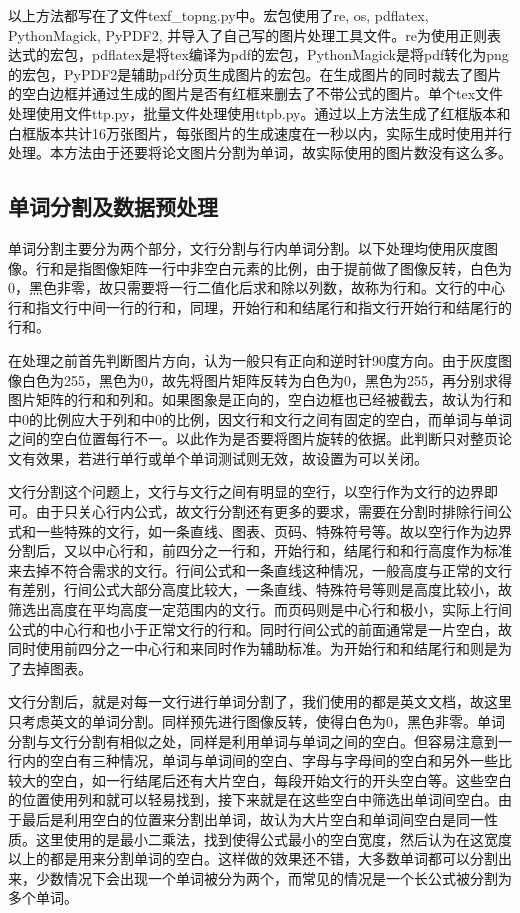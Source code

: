 \documentclass[12pt]{article}
\begin{document}
以上方法都写在了文件texf\_topng.py中。宏包使用了re, os, pdflatex, PythonMagick, PyPDF2, 并导入了自己写的图片处理工具文件。re为使用正则表达式的宏包，pdflatex是将tex编译为pdf的宏包，PythonMagick是将pdf转化为png的宏包，PyPDF2是辅助pdf分页生成图片的宏包。在生成图片的同时裁去了图片的空白边框并通过生成的图片是否有红框来删去了不带公式的图片。单个tex文件处理使用文件ttp.py，批量文件处理使用ttpb.py。通过以上方法生成了红框版本和白框版本共计16万张图片，每张图片的生成速度在一秒以内，实际生成时使用并行处理。本方法由于还要将论文图片分割为单词，故实际使用的图片数没有这么多。

\subsection{单词分割及数据预处理}
\noindent

单词分割主要分为两个部分，文行分割与行内单词分割。以下处理均使用灰度图像。行和是指图像矩阵一行中非空白元素的比例，由于提前做了图像反转，白色为0，黑色非零，故只需要将一行二值化后求和除以列数，故称为行和。文行的中心行和指文行中间一行的行和，同理，开始行和和结尾行和指文行开始行和结尾行的行和。

在处理之前首先判断图片方向，认为一般只有正向和逆时针90度方向。由于灰度图像白色为255，黑色为0，故先将图片矩阵反转为白色为0，黑色为255，再分别求得图片矩阵的行和和列和。如果图象是正向的，空白边框也已经被截去，故认为行和中0的比例应大于列和中0的比例，因文行和文行之间有固定的空白，而单词与单词之间的空白位置每行不一。以此作为是否要将图片旋转的依据。此判断只对整页论文有效果，若进行单行或单个单词测试则无效，故设置为可以关闭。

文行分割这个问题上，文行与文行之间有明显的空行，以空行作为文行的边界即可。由于只关心行内公式，故文行分割还有更多的要求，需要在分割时排除行间公式和一些特殊的文行，如一条直线、图表、页码、特殊符号等。故以空行作为边界分割后，又以中心行和，前四分之一行和，开始行和，结尾行和和行高度作为标准来去掉不符合需求的文行。行间公式和一条直线这种情况，一般高度与正常的文行有差别，行间公式大部分高度比较大，一条直线、特殊符号等则是高度比较小，故筛选出高度在平均高度一定范围内的文行。而页码则是中心行和极小，实际上行间公式的中心行和也小于正常文行的行和。同时行间公式的前面通常是一片空白，故同时使用前四分之一中心行和来同时作为辅助标准。为开始行和和结尾行和则是为了去掉图表。

文行分割后，就是对每一文行进行单词分割了，我们使用的都是英文文档，故这里只考虑英文的单词分割。同样预先进行图像反转，使得白色为0，黑色非零。单词分割与文行分割有相似之处，同样是利用单词与单词之间的空白。但容易注意到一行内的空白有三种情况，单词与单词间的空白、字母与字母间的空白和另外一些比较大的空白，如一行结尾后还有大片空白，每段开始文行的开头空白等。这些空白的位置使用列和就可以轻易找到，接下来就是在这些空白中筛选出单词间空白。由于最后是利用空白的位置来分割出单词，故认为大片空白和单词间空白是同一性质。这里使用的是最小二乘法，找到使得公式最小的空白宽度，然后认为在这宽度以上的都是用来分割单词的空白。这样做的效果还不错，大多数单词都可以分割出来，少数情况下会出现一个单词被分为两个，而常见的情况是一个长公式被分割为多个单词。
\end{document}
